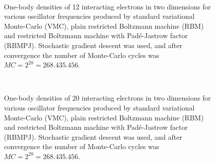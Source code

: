 \begin{figure} [H]%
	\centering
	\\
	
	\caption{One-body densities of 12 interacting electrons in two dimensions for various oscillator frequencies produced by standard variational Monte-Carlo (VMC), plain restricted Boltzmann machine (RBM) and restricted Boltzmann machine with Padé-Jastrow factor (RBMPJ). Stochastic gradient descent was used, and after convergence the number of Monte-Carlo cycles was $MC=2^{28}=268.435.456$.}%
	\label{fig:OB_interaction_12P_2D}
\end{figure}

\begin{figure} [H]%
	\centering
	\\
	
	\caption{One-body densities of 20 interacting electrons in two dimensions for various oscillator frequencies produced by standard variational Monte-Carlo (VMC), plain restricted Boltzmann machine (RBM) and restricted Boltzmann machine with Padé-Jastrow factor (RBMPJ). Stochastic gradient descent was used, and after convergence the number of Monte-Carlo cycles was $MC=2^{28}=268.435.456$.}%
	\label{fig:OB_interaction_20P_2D}
\end{figure}

